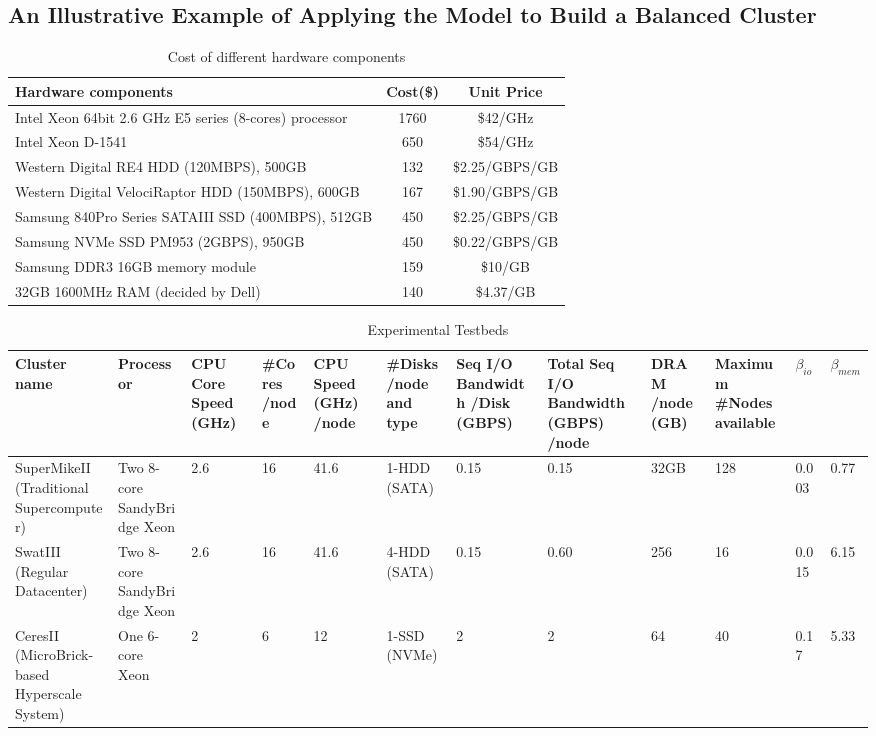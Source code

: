 \documentclass[journal]{IEEEtran}
\begin{document}
\subsection{An Illustrative Example of Applying the Model to Build a Balanced Cluster}
\begin{table}[!t]
\caption{Cost of different hardware components}
\label{tab:Cost}
\centering
\begin{tabular}{|p{4cm}|c|c|}
\hline
Hardware components & Cost(\$) & Unit Price\\
\hline
Intel Xeon 64bit 2.6 GHz E5 series (8-cores) processor & 1760 & \$42/GHz\\
\hline
Intel Xeon D-1541 & 650 & \$54/GHz\\
\hline
\hline
Western Digital RE4 HDD (120MBPS), 500GB & 132 & \$2.25/GBPS/GB\\
\hline
Western Digital VelociRaptor HDD (150MBPS), 600GB & 167 & \$1.90/GBPS/GB\\
\hline
Samsung 840Pro Series SATAIII SSD (400MBPS), 512GB & 450 & \$2.25/GBPS/GB\\
\hline
Samsung NVMe SSD PM953 (2GBPS), 950GB & 450 & \$0.22/GBPS/GB\\
\hline
\hline
Samsung DDR3 16GB memory module & 159 & \$10/GB\\
\hline
32GB 1600MHz RAM (decided by Dell) & 140 & \$4.37/GB\\
\hline
\end{tabular}
\end{table}
\begin{table}[!t]
\caption{Experimental Testbeds}
\label{tab:Testbeds}
\centering
\begin{tabular}{|p{1.8cm}|p{2cm}|p{1cm}|p{1cm}|p{1cm}|p{1cm}|p{1cm}|p{1cm}|p{1cm}|p{1cm}|p{0.6cm}|p{0.6cm}|}
\hline
Cluster name & Processor & CPU Core Speed (GHz) & \#Cores /node & CPU Speed (GHz) /node & \#Disks /node and type & Seq I/O Bandwidth /Disk (GBPS) & Total Seq I/O Bandwidth (GBPS) /node & DRAM /node (GB) & Maximum \#Nodes available & $\beta_{io}$ & $\beta_{mem}$\\
\hline
SuperMikeII (Traditional Supercomputer) & Two 8-core SandyBridge Xeon & 2.6 & 16 & 41.6 & 1-HDD (SATA) & 0.15 & 0.15 & 32GB & 128 & 0.003 & 0.77\\
\hline
SwatIII (Regular Datacenter) & Two 8-core SandyBridge Xeon & 2.6 &  16 & 41.6 & 4-HDD (SATA) & 0.15 & 0.60 & 256 & 16 & 0.015 & 6.15\\
\hline
CeresII (MicroBrick-based Hyperscale System) & One 6-core Xeon & 2 & 6 & 12 & 1-SSD (NVMe) & 2 & 2 & 64 & 40 & 0.17 & 5.33\\
\hline
\end{tabular}
\end{table}
\end{document}
